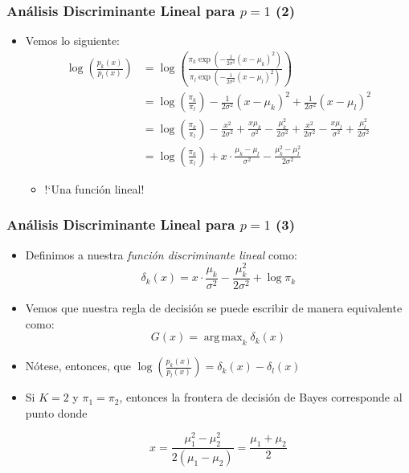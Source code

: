 \documentclass[usenames,dvipsnames]{beamer} %
\DeclareMathOperator*{\argmax}{arg\,max}
\newcommand\defi[1]{\textcolor{NavyBlue}{\textit{#1}}}
\begin{document}
\begin{frame}\frametitle{An\'alisis Discriminante Lineal para $p=1$ (2)}
\begin{itemize}
	\item Vemos lo siguiente:
	\begin{equation*}
	\begin{aligned}
	\log{\left(\frac{p_k(x)}{p_l(x)}\right)}&= \log{\left( \frac{\pi_k \exp{\left( -\frac{1}{2\sigma^{2}}(x-\mu_k)^2 \right)}}{\pi_l \exp{\left( -\frac{1}{2\sigma^{2}}(x-\mu_l)^2 \right)}} \right)}\\
	&= \log{\left( \frac{\pi_k}{\pi_l} \right)} - \frac{1}{2\sigma^{2}}(x-\mu_k)^2 + \frac{1}{2\sigma^{2}}(x-\mu_l)^2\\
	&= \log{\left( \frac{\pi_k}{\pi_l} \right)} - \frac{x^2}{2\sigma^2}+\frac{x \mu_k}{\sigma^2} -\frac{\mu_k^2}{2\sigma^2}+ \frac{x^2}{2\sigma^2} -\frac{x \mu_l}{\sigma^2} +\frac{\mu_l^2}{2\sigma^2}\\
	&= \log{\left( \frac{\pi_k}{\pi_l} \right)} + x \cdot\frac{\mu_k - \mu_l}{\sigma^2} - \frac{\mu_k^2-\mu_l^2}{2\sigma^2}
	\end{aligned}
	\end{equation*}
	\begin{itemize}
		\item !`Una funci\'on lineal!
	\end{itemize}
\end{itemize}
\end{frame}

\begin{frame}\frametitle{An\'alisis Discriminante Lineal para $p=1$ (3)}
\begin{itemize}
	\item Definimos a nuestra \defi{funci\'on discriminante lineal} como:
	\begin{equation}\label{eq:islr_4-13}
	\delta_k(x) = x\cdot \frac{\mu_k}{\sigma^2}-\frac{\mu_k^2}{2\sigma^2}+\log{\pi_k}
	\end{equation}
	\item Vemos que nuestra regla de decisi\'on se puede escribir de manera equivalente como:
	\[ G(x) = \argmax_k \delta_k(x) \]
	\item N\'otese, entonces, que $\log{\left(\frac{p_k(x)}{p_l(x)}\right)} = \delta_k(x)-\delta_l(x)$
	\item Si $K=2$ y $\pi_1=\pi_2$, entonces la frontera de decisi\'on de Bayes corresponde al punto donde
	
	\[ x=\frac{\mu_1^2-\mu_2^2}{2(\mu_1-\mu_2)}=\frac{\mu_1+\mu_2}{2} \]
\end{itemize}
\end{frame}
\end{document}

